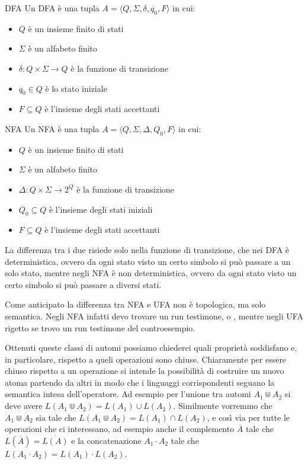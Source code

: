 \begin{definition}{DFA}
  Un DFA è una tupla \(A = \langle Q, \Sigma, \delta, q_0, F\rangle\) in cui:
  \begin{itemize}
    \item \(Q\) è un insieme finito di stati
    \item \(\Sigma\) è un alfabeto finito
    \item \(\delta: Q \times \Sigma \to Q\) è la funzione di transizione
    \item \(q_0 \in Q\) è lo stato iniziale
    \item \(F \subseteq Q\) è l'insieme degli stati accettanti
  \end{itemize}
\end{definition}

\begin{definition}{NFA}
  Un NFA è una tupla \(A = \langle Q, \Sigma, \Delta, Q_0, F\rangle\) in cui:
  \begin{itemize}
    \item \(Q\) è un insieme finito di stati
    \item \(\Sigma\) è un alfabeto finito
    \item \(\Delta: Q \times \Sigma \to 2^Q\) è la funzione di transizione
    \item \(Q_0 \subseteq Q\) è l'insieme degli stati iniziali
    \item \(F \subseteq Q\) è l'insieme degli stati accettanti
  \end{itemize}
\end{definition}

La differenza tra i due risiede solo nella funzione di transizione, che nei DFA è deterministica, ovvero da ogni stato visto un certo simbolo si può passare a un solo stato, mentre negli NFA è non deterministica, ovvero da ogni stato visto un certo simbolo si può passare a diversi stati.

Come anticipato la differenza tra NFA e UFA non è topologica, ma solo semantica. Negli NFA infatti devo trovare un run testimone, o , mentre negli UFA rigetto se trovo un run testimone del controesempio.

Ottenuti queste classi di automi possiamo chiederci quali proprietà soddisfano e, in particolare, rispetto a queli operazioni sono chiuse. Chiaramente per essere chiuso rispetto a un operazione si intende la possibilità di costruire un nuovo atoma partendo da altri in modo che i linguaggi corrispondenti seguano la semantica intesa dell'operatore. Ad esempio per l'unione tra automi \(A_1 \Cup A_2\) si deve avere \(L(A_1 \Cup A_2) = L(A_1) \cup L(A_2)\). Similmente vorremmo che \(A_1 \Cup A_2\) sia tale che \(L(A_1 \Cup A_2) = L(A_1) \cap L(A_2)\), e così via per tutte le operazioni che ci interessano, ad esempio anche il complemento \(\overline{A}\) tale che \(L(\overline{A}) = \overline{L(A)}\) e la concatenazione \(A_1 \cdot A_2\) tale che \(L(A_1 \cdot A_2) = L(A_1) \cdot L(A_2)\).

